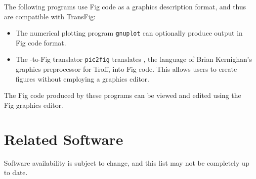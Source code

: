 The following programs use Fig code as a graphics description format,
	and thus are compatible with TransFig:
%
\begin{itemize}

\item The numerical plotting program {\tt gnuplot} can optionally produce 
	output in Fig code format.

\item The \PIC-to-Fig translator {\tt pic2fig} translates \PIC,
	the language of Brian Kernighan's graphics preprocessor for Troff,
	into Fig code.
This allows users to create figures without employing a	graphics editor.

\end{itemize}
%
The Fig code produced by these programs can be viewed and edited 
	using the Fig graphics editor.

\vfill
\pagebreak
\section{Related Software}
\label{s:software}

Software availability is subject to change, and this list may not be
	completely up to date.

